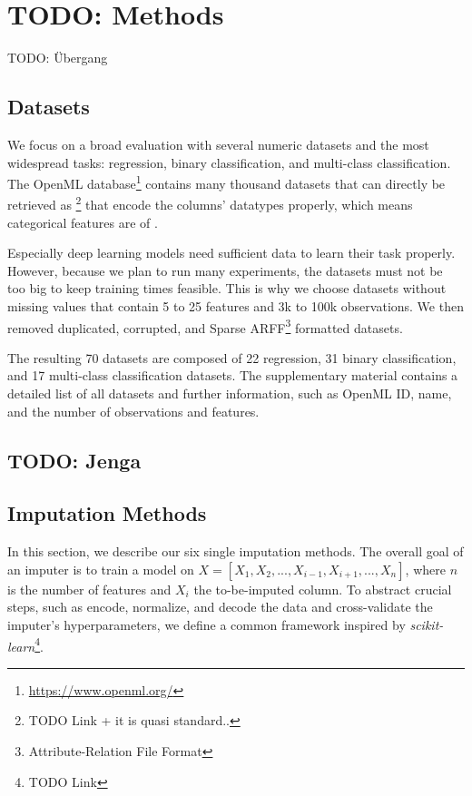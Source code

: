 

\section{TODO: Methods}
%
TODO: Übergang

\subsection{Datasets}
%
We focus on a broad evaluation with several numeric datasets and the most widespread tasks: regression, binary classification, and multi-class classification. The OpenML database\footnote{\url{https://www.openml.org/}} contains many thousand datasets that can directly be retrieved as \footnote{TODO Link + it is quasi standard..} that encode the columns' datatypes properly, which means categorical features are of  .

Especially deep learning models need sufficient data to learn their task properly. However, because we plan to run many experiments, the datasets must not be too big to keep training times feasible. This is why we choose datasets without missing values that contain 5 to 25 features and 3k to 100k observations. We then removed duplicated, corrupted, and Sparse ARFF\footnote{Attribute-Relation File Format} formatted datasets.

The resulting 70 datasets are composed of 22 regression, 31 binary classification, and 17 multi-class classification datasets. The supplementary material contains a detailed list of all datasets and further information, such as OpenML ID, name, and the number of observations and features.


\subsection{TODO: Jenga}
%


\subsection{Imputation Methods}
%
In this section, we describe our six single imputation methods. The overall goal of an imputer is to train a model on $X = [X_1, X_2, ..., X_{i-1}, X_{i+1}, ..., X_n]$, where $n$ is the number of features and $X_i$ the to-be-imputed column. To abstract crucial steps, such as encode, normalize, and decode the data and cross-validate the imputer's hyperparameters, we define a common framework inspired by \emph{scikit-learn}\footnote{TODO Link}.


